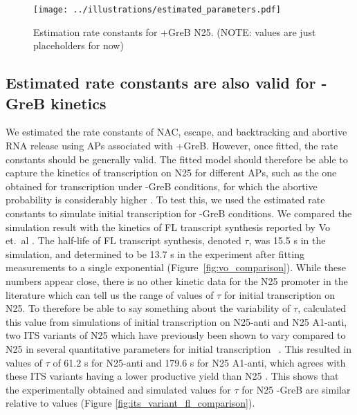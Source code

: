 \begin{figure}
	\begin{center}
      \texttt{[image: ../illustrations/estimated\_parameters.pdf]}
	\end{center}
    \caption{Estimation rate constants for +GreB N25. (NOTE: values are just
    placeholders for now)}
    \label{fig:parameter_estimation}
\end{figure}

\subsection{Estimated rate constants are also valid for -GreB kinetics}
We estimated the rate constants of NAC, escape, and backtracking and abortive
RNA release using APs associated with +GreB. However, once fitted, the rate
constants should be generally valid. The fitted model should therefore be able
to capture the kinetics of transcription on N25 for different APs, such as the
one obtained for transcription under -GreB conditions, for which the abortive
probability is considerably higher \cite{hsu_initial_2006}. To test this, we
used the estimated rate constants to simulate initial transcription for -GreB
conditions. We compared the simulation result with the kinetics of FL
transcript synthesis reported by Vo et.\ al \cite{vo_vitro_2003-1}. The
half-life of FL transcript synthesis, denoted $\tau$, was 15.5 s in the
simulation, and determined to be 13.7 s in the experiment after fitting
measurements to a single exponential (Figure~\ref{fig:vo_comparison}). While these
numbers appear close, there is no other kinetic data for the N25 promoter in
the literature which can tell us the range of values of $\tau$ for initial
transcription on N25. To therefore be able to say something about the
variability of $\tau$, calculated this value from simulations of initial
transcription on N25-anti and N25 A1-anti, two ITS variants of N25 which have
previously been shown to vary compared to N25 in several quantitative
parameters for initial transcription~
\cite{hsu_initial_2006,chan_anti-initial_2001,kammerer_functional_1986}. This
resulted in values of $\tau$ of 61.2 s for N25-anti and 179.6 s for N25
A1-anti, which agrees with these ITS variants having a lower productive yield
than N25 \cite{hsu_initial_2006}. This shows that the experimentally obtained
and simulated values for $\tau$ for N25 -GreB are similar relative to values
(Figure \ref{fig:its_variant_fl_comparison}).

